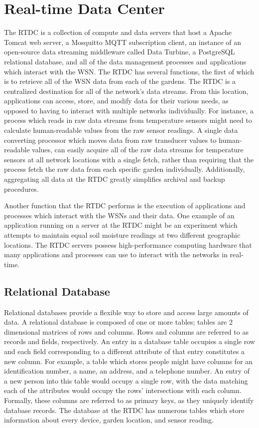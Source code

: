 \section{Real-time Data Center}
The RTDC is a collection of compute and data servers that host a Apache Tomcat web server, a Mosquitto MQTT subscription client, an instance of an open-source data streaming middleware called Data Turbine, a PostgreSQL relational database, and all of the data management processes and applications which interact with the WSN. The RTDC has several functions, the first of which is to retrieve all of the WSN data from each of the gardens. The RTDC is a centralized destination for all of the network's data streams. From this location, applications can access, store, and modify data for their various needs, as opposed to having to interact with multiple networks individually. For instance, a process which reads in raw data streams from temperature sensors might need to calculate human-readable values from the raw sensor readings. A single data converting processor which moves data from raw transducer values to human-readable values, can easily acquire all of the raw data streams for temperature sensors at all network locations with a single fetch, rather than requiring that the process fetch the raw data from each specific garden individually. Additionally, aggregating all data at the RTDC greatly simplifies archival and backup procedures.

Another function that the RTDC performs is the execution of applications and processes which interact with the WSNs and their data. One example of an application running on a server at the RTDC might be an experiment which attempts to maintain equal soil moisture readings at two different geographic locations. The RTDC servers possess high-performance computing hardware that many applications and processes can use to interact  with the networks in real-time.

\subsection{Relational Database}
Relational databases provide a flexible way to store and access large amounts of data. A relational database is composed of one or more tables; tables are 2 dimensional matrices of rows and columns. Rows and columns are referred to as records and fields, respectively. An entry in a database table occupies a single row and each field corresponding to a different attribute of that entry constitutes a new column. For example, a table which stores people might have columns for an identification number, a name, an address, and a telephone number. An entry of a new person into this table would occupy a single row, with the data matching each of the attributes would occupy the rows' intersections with each column. Formally, these columns are referred to as primary keys, as they uniquely identify database records. The database at the RTDC has numerous tables which store information about every device, garden location, and sensor reading.

